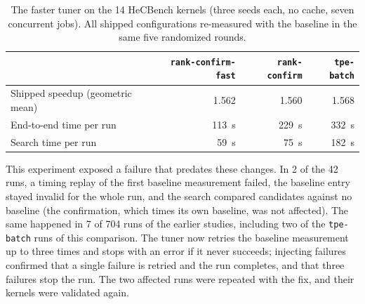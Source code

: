 \documentclass[10pt]{article}
\newcommand{\code}[1]{\texttt{#1}}
\begin{document}
\begin{table}[t]
\centering
\caption{The faster tuner on the 14 HeCBench kernels (three seeds each, no cache, seven
concurrent jobs). All shipped configurations re-measured with the baseline in the same
five randomized rounds.}
\label{tab:hecval2}
\small
\begin{tabular}{lrrr}
\toprule
& \code{rank-confirm-fast} & \code{rank-confirm} & \code{tpe-batch} \\
\midrule
Shipped speedup (geometric mean) & 1.562 & 1.560 & 1.568 \\
End-to-end time per run & 113~s & 229~s & 332~s \\
Search time per run & 59~s & 75~s & 182~s \\
\bottomrule
\end{tabular}
\end{table}

This experiment exposed a failure that predates these changes. In 2 of the 42
runs, a timing replay of the first baseline measurement failed, the baseline
entry stayed invalid for the whole run, and the search compared candidates
against no baseline (the confirmation, which times its own baseline, was not
affected). The same happened in 7 of 704 runs of the earlier studies, including
two of the \code{tpe-batch} runs of this comparison. The tuner now retries the
baseline measurement up to three times and stops with an error if it never
succeeds; injecting failures confirmed that a single failure is retried and
the run completes, and that three failures stop the run. The two affected runs
were repeated with the fix, and their kernels were validated again.
\end{document}
